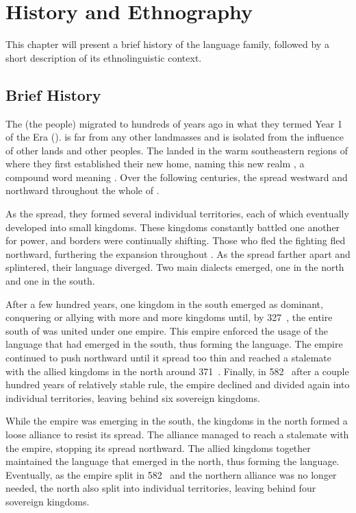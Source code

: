 \chapter{History and Ethnography}
\label{cha:tvk-ethnography}

This chapter will present a brief history of the \langtvk{} language family, followed by a short description of its ethnolinguistic context.

\section{Brief History}
\label{sec:tvk-history}

The \peoptvk{} (the \langtvk{} people) migrated to \landn{} hundreds of years ago in what they termed Year 1 of the \landadj{} Era (). \landn{} is far from any other landmasses and is isolated from the influence of other lands and other peoples. The \peoptvk{} landed in the warm southeastern regions of \landn{} where they first established their new home, naming this new realm , a compound word meaning . Over the following centuries, the \peoptvk{} spread westward and northward throughout the whole of \landn.

As the \peoptvk{} spread, they formed several individual territories, each of which eventually developed into small kingdoms. These kingdoms constantly battled one another for power, and borders were continually shifting. Those who fled the fighting fled northward, furthering the \langtvk{} expansion throughout \landn. As the \peoptvk{} spread farther apart and splintered, their language diverged. Two main dialects emerged, one in the north and one in the south.

After a few hundred years, one kingdom in the south emerged as dominant, conquering or allying with more and more kingdoms until, by 327~, the entire south of \landn{} was united under one empire. This empire enforced the usage of the language that had emerged in the south, thus forming the \langank{} language. The empire continued to push northward until it spread too thin and reached a stalemate with the allied kingdoms in the north around 371~. Finally, in 582~ after a couple hundred years of relatively stable rule, the empire declined and divided again into individual territories, leaving behind six sovereign kingdoms.

While the empire was emerging in the south, the kingdoms in the north formed a loose alliance to resist its spread. The alliance managed to reach a stalemate with the empire, stopping its spread northward. The allied kingdoms together maintained the language that emerged in the north, thus forming the \langrdk{} language. Eventually, as the empire split in 582~ and the northern alliance was no longer needed, the north also split into individual territories, leaving behind four sovereign kingdoms.

